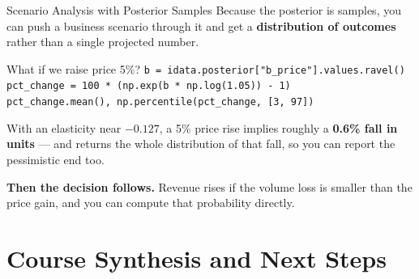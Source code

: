 \documentclass[aspectratio=169, 11pt]{beamer}
\begin{document}
\begin{frame}{Scenario Analysis with Posterior Samples}
  Because the posterior is samples, you can push a business scenario through it and get a
  \textbf{distribution of outcomes} rather than a single projected number.

  \begin{examplebox}{What if we raise price 5\%?}
    {\scriptsize\linespread{1.05}\selectfont
    \texttt{b = idata.posterior["b\_price"].values.ravel()}\\
    \texttt{pct\_change = 100 * (np.exp(b * np.log(1.05)) - 1)}\\[2pt]
    \texttt{pct\_change.mean(), np.percentile(pct\_change, [3, 97])}
    }
  \end{examplebox}

  With an elasticity near $-0.127$, a 5\% price rise implies roughly a \textbf{0.6\% fall in
  units} --- and returns the whole distribution of that fall, so you can report the pessimistic
  end too.

  \vspace{0.1cm}
  \textbf{Then the decision follows.} Revenue rises if the volume loss is smaller than the price
  gain, and you can compute that probability directly.

\end{frame}

\section{Course Synthesis and Next Steps}

\end{document}
